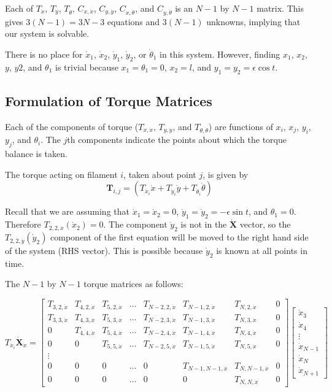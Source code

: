 \documentclass[12pt,letterpaper,titlepage]{article}
\begin{document}
Each of $T_{\dot{x}}$, $T_{\dot{y}}$, $T_{\dot{\theta}}$, $C_{x,\dot{x}}$, $C_{y,\dot{y}}$, $C_{x,\dot{\theta}}$, and $C_{y,\dot{\theta}}$ is an $N - 1$ by $N - 1$ matrix. This gives $3(N - 1) = 3N - 3$ equations and $3(N - 1)$ unknowns, implying that our system is solvable.

There is no place for $\dot{x}_1$, $\dot{x}_2$, $\dot{y}_1$, $\dot{y}_2$, or $\dot{\theta}_1$ in this system. However, finding $x_1$, $x_2$, $y$, $y2$, and $\theta_1$ is trivial because $x_1 = \theta_1 = 0$, $x_2 = l$, and $y_1 = y_2 = \epsilon \cos t$.

\newpage
\subsection{Formulation of Torque Matrices}
Each of the components of torque ($T_{x,\dot{x}}$, $T_{y,\dot{y}}$, and $T_{\theta,\dot{\theta}}$) are functions of $x_i$, $x_j$, $y_i$, $y_j$, and $\theta_i$. The $j$th components indicate the points about which the torque balance is taken.

The torque acting on filament $i$, taken about point $j$, is given by
\begin{equation}
\mathbf{T}_{i,j} = (T_{\dot{x}_i}\dot{x}+T_{\dot{y}_i}\dot{y}+T_{\dot{\theta}_i}\dot{\theta})
\end{equation}

Recall that we are assuming that $\dot{x}_1 = \dot{x}_2 = 0$, $\dot{y}_1 = \dot{y}_2 = -\epsilon \sin t$, and $\theta_1 = 0$. Therefore  $T_{2,2,\dot{x}} (\dot{x}_2) = 0$. The component $\dot{y}_2$ is not in the $\mathbf{\dot{X}}$ vector, so the $T_{2,2,\dot{y}} (\dot{y}_2)$ component of the first equation will be moved to the right hand side of the system (RHS vector). This is possible because $\dot{y}_2$ is known at all points in time.

The $N-1$ by $N-1$ torque matrices as follows:

\[
T_{\dot{x}_i}\mathbf{\dot{X}}_{\dot{x}} = \begin{bmatrix}
T_{3,2,\dot{x}}&T_{4,2,\dot{x}}&T_{5,2,\dot{x}}&\hdots&T_{N-2,2,\dot{x}}&T_{N-1,2,\dot{x}}&T_{N,2,\dot{x}}&0\\
T_{3,3,\dot{x}}&T_{4,3,\dot{x}}&T_{5,3,\dot{x}}&\hdots&T_{N-2,3,\dot{x}}&T_{N-1,3,\dot{x}}&T_{N,3,\dot{x}}&0\\
0&T_{4,4,\dot{x}}&T_{5,4,\dot{x}}&\hdots&T_{N-2,4,\dot{x}}&T_{N-1,4,\dot{x}}&T_{N,4,\dot{x}}&0\\
0&0&T_{5,5,\dot{x}}&\hdots&T_{N-2,5,\dot{x}}&T_{N-1,5,\dot{x}}&T_{N,5,\dot{x}}&0\\
\vdots\\
0&0&0&\hdots&0&T_{N-1,N-1,\dot{x}}&T_{N,N-1,\dot{x}}&0\\
0&0&0&\hdots&0&0&T_{N,N,\dot{x}}&0
\end{bmatrix}
\begin{bmatrix}
\dot{x}_3\\
\dot{x}_4\\
\vdots\\
\dot{x}_{N-1}\\
\dot{x}_{N}\\
\dot{x}_{N+1}
\end{bmatrix}
\]
\end{document}
